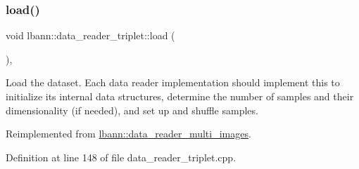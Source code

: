 \subsubsection{\texorpdfstring{load()}{load()}}
{\footnotesize\ttfamily void lbann\+::data\+\_\+reader\+\_\+triplet\+::load (\begin{DoxyParamCaption}{ }\end{DoxyParamCaption})\hspace{0.3cm}{\ttfamily [override]}, {\ttfamily [virtual]}}

Load the dataset. Each data reader implementation should implement this to initialize its internal data structures, determine the number of samples and their dimensionality (if needed), and set up and shuffle samples. 

Reimplemented from \hyperlink{classlbann_1_1data__reader__multi__images_afb8adef1f9ac6723d71ae5afc29b01ec}{lbann\+::data\+\_\+reader\+\_\+multi\+\_\+images}.



Definition at line 148 of file data\+\_\+reader\+\_\+triplet.\+cpp.


